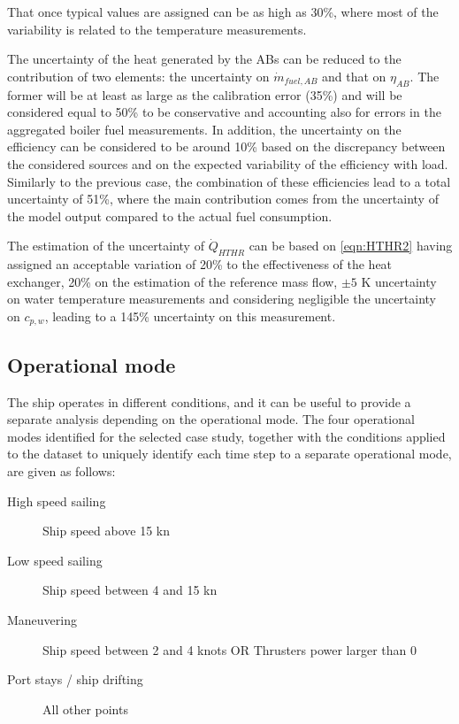 \documentclass[preprint,12pt]{elsarticle}
\begin{document}
That once typical values are assigned can be as high as 30\%, where most of the variability is related to the temperature measurements.

The uncertainty of the heat generated by the ABs can be reduced to the contribution of two elements: the uncertainty on $\dot{m}_{fuel,AB}$ and that on $\eta_{AB}$. The former will be at least as large as the calibration error (35\%) and will be considered equal to 50\% to be conservative and accounting also for errors in the aggregated boiler fuel measurements. In addition, the uncertainty on the efficiency can be considered to be around 10\% based on the discrepancy between the considered sources and on the expected variability of the efficiency with load. Similarly to the previous case, the combination of these efficiencies lead to a total uncertainty of 51\%, where the main contribution comes from the uncertainty of the model output compared to the actual fuel consumption.

The estimation of the uncertainty of $\dot{Q}_{HTHR}$ can be based on \ref{eqn:HTHR2} having assigned an acceptable variation of 20\% to the effectiveness of the heat exchanger, 20\% on the estimation of the reference mass flow, $\pm 5$ K uncertainty on water temperature measurements and considering negligible the uncertainty on $c_{p,w}$, leading to a 145\% uncertainty on this measurement. 


\subsection{Operational mode} \label{sec:met:operationalMode}

The ship operates in different conditions, and it can be useful to provide a separate analysis depending on the operational mode. The four operational modes identified for the selected case study, together with the conditions applied to the dataset to uniquely identify each time step to a separate operational mode, are given as follows:
\begin{description}
	\item[High speed sailing] Ship speed above 15 kn
	\item[Low speed sailing] Ship speed between 4 and 15 kn
	\item[Maneuvering] Ship speed between 2 and 4 knots OR Thrusters power larger than 0
	\item[Port stays / ship drifting] All other points
\end{description}
\end{document}
